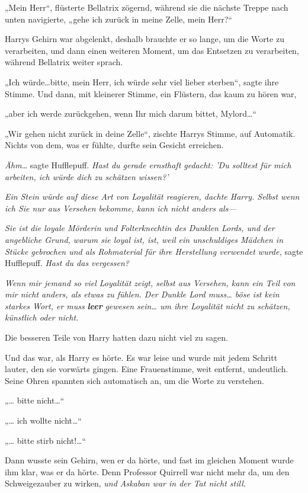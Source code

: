 {„Mein Herr“, flüsterte Bellatrix zögernd, während sie die nächste Treppe nach unten navigierte, „gehe ich zurück in meine Zelle, mein Herr?“

Harrys Gehirn war abgelenkt, deshalb brauchte er so lange, um die Worte zu verarbeiten, und dann einen weiteren Moment, um das Entsetzen zu verarbeiten, während Bellatrix weiter sprach.

„Ich würde…bitte, mein Herr, ich würde sehr viel lieber sterben“, sagte ihre Stimme. Und dann, mit kleinerer Stimme, ein Flüstern, das kaum zu hören war,

„aber ich werde zurückgehen, wenn Ihr mich darum bittet, Mylord…“

„Wir gehen nicht zurück in deine Zelle“, zischte Harrys Stimme, auf Automatik. Nichts von dem, was er fühlte, durfte sein Gesicht erreichen.

\emph{Ähm}… sagte Hufflepuff. \emph{Hast du gerade ernsthaft gedacht: 'Du solltest für mich arbeiten, ich würde dich zu schätzen wissen?'}

\emph{Ein Stein würde auf diese Art von Loyalität reagieren, dachte Harry. Selbst wenn ich Sie nur aus Versehen bekomme, kann ich nicht anders als—}

\emph{Sie ist die loyale Mörderin und Folterknechtin des Dunklen Lords, und der angebliche Grund, warum sie loyal ist, ist, weil ein unschuldiges Mädchen in Stücke gebrochen und als Rohmaterial für ihre Herstellung verwendet wurde,} sagte Hufflepuff. \emph{Hast du das vergessen?}

\emph{Wenn mir jemand so viel Loyalität zeigt, selbst aus Versehen, kann ein Teil von mir nicht anders, als etwas zu fühlen. Der Dunkle Lord muss… böse ist kein starkes Wort, er muss} \textbf{\emph{leer}} \emph{gewesen sein… um ihre Loyalität nicht zu schätzen, künstlich oder nicht.}

Die besseren Teile von Harry hatten dazu nicht viel zu sagen.

Und das war, als Harry es hörte. Es war leise und wurde mit jedem Schritt lauter, den sie vorwärts gingen. Eine Frauenstimme, weit entfernt, undeutlich. Seine Ohren spannten sich automatisch an, um die Worte zu verstehen.

„… bitte nicht…“

„… ich wollte nicht…“

„… bitte stirb nicht!…“

Dann wusste sein Gehirn, wen er da hörte, und fast im gleichen Moment wurde ihm klar, was er da hörte. Denn Professor Quirrell war nicht mehr da, um den Schweigezauber zu wirken, \emph{und Askaban war in der Tat nicht still.}

}
